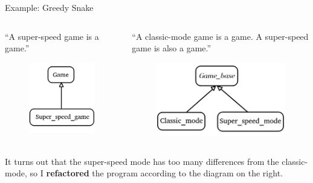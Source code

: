 \documentclass{beamer}
\begin{document}
\begin{frame}{Example: Greedy Snake}
    \begin{columns}
        \begin{column}{0.5\linewidth}
            ``A super-speed game is a game.''
            \begin{figure}[h]
                \centering
                \includegraphics[scale=0.5]{figures/snake_original.png}
            \end{figure}
        \end{column}
        \begin{column}{0.5\linewidth}
            ``A classic-mode game is a game. A super-speed game is also a game.''
            \begin{figure}[h]
                \centering
                \includegraphics[width=\textwidth]{figures/snake_new.png}
            \end{figure}
        \end{column}
    \end{columns}
    It turns out that the super-speed mode has too many differences from the classic-mode, so I \textbf{refactored} the program according to the diagram on the right.
\end{frame}
\end{document}
